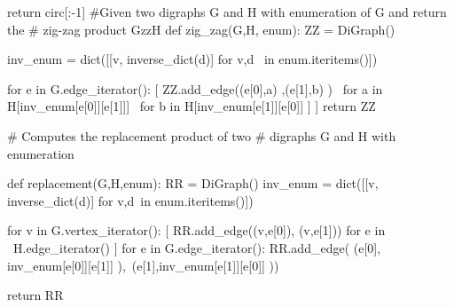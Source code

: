 \begin{sageblock}
    return circ[:-1]
#Given two digraphs G and H with enumeration of G  and return the
# zig-zag product GzzH
def zig_zag(G,H, enum):
    ZZ = DiGraph()
    
    inv_enum = dict([[v, inverse_dict(d)] for v,d \
    in enum.iteritems()])
     
    for e in G.edge_iterator():
        [ ZZ.add_edge((e[0],a) ,(e[1],b) ) \ 
        for a in H[inv_enum[e[0]][e[1]]] \
        for b in H[inv_enum[e[1]][e[0]] ] ]
    return ZZ

# Computes the replacement product of two
# digraphs G and H with enumeration

def replacement(G,H,enum):
    RR = DiGraph()
    inv_enum = dict([[v, inverse_dict(d)] for v,d\
    in enum.iteritems()])

    for v in G.vertex_iterator():
        [ RR.add_edge((v,e[0]), (v,e[1])) for e in \
        H.edge_iterator() ]
    for e in G.edge_iterator():
        RR.add_edge( (e[0], inv_enum[e[0]][e[1]] ),\
        (e[1],inv_enum[e[1]][e[0]] )) 

    return RR
\end{sageblock}

